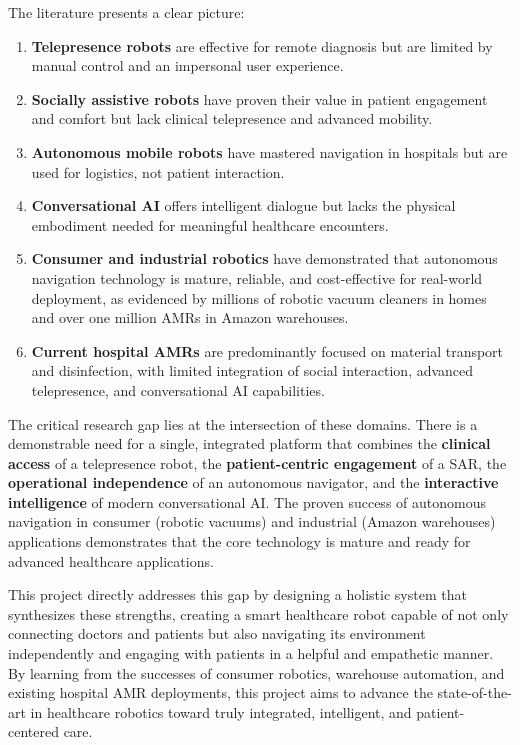The literature presents a clear picture:
\begin{enumerate}
    \item \textbf{Telepresence robots} are effective for remote diagnosis but are limited by manual control and an impersonal user experience.
    \item \textbf{Socially assistive robots} have proven their value in patient engagement and comfort but lack clinical telepresence and advanced mobility.
    \item \textbf{Autonomous mobile robots} have mastered navigation in hospitals but are used for logistics, not patient interaction.
    \item \textbf{Conversational AI} offers intelligent dialogue but lacks the physical embodiment needed for meaningful healthcare encounters.
    \item \textbf{Consumer and industrial robotics} have demonstrated that autonomous navigation technology is mature, reliable, and cost-effective for real-world deployment, as evidenced by millions of robotic vacuum cleaners in homes and over one million AMRs in Amazon warehouses.
    \item \textbf{Current hospital AMRs} are predominantly focused on material transport and disinfection, with limited integration of social interaction, advanced telepresence, and conversational AI capabilities.
\end{enumerate}

The critical research gap lies at the intersection of these domains. There is a demonstrable need for a single, integrated platform that combines the \textbf{clinical access} of a telepresence robot, the \textbf{patient-centric engagement} of a SAR, the \textbf{operational independence} of an autonomous navigator, and the \textbf{interactive intelligence} of modern conversational AI. The proven success of autonomous navigation in consumer (robotic vacuums) and industrial (Amazon warehouses) applications demonstrates that the core technology is mature and ready for advanced healthcare applications.

This project directly addresses this gap by designing a holistic system that synthesizes these strengths, creating a smart healthcare robot capable of not only connecting doctors and patients but also navigating its environment independently and engaging with patients in a helpful and empathetic manner. By learning from the successes of consumer robotics, warehouse automation, and existing hospital AMR deployments, this project aims to advance the state-of-the-art in healthcare robotics toward truly integrated, intelligent, and patient-centered care.

\clearpage
